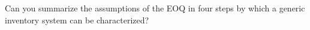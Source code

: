 \begin{exercise}
  Can you summarize the assumptions of the EOQ in four steps by which
  a generic inventory system can be characterized?

\end{exercise}

